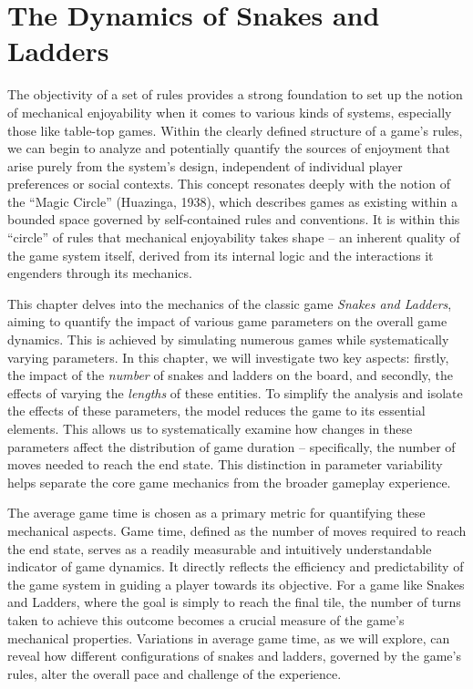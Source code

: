 \chapter{The Dynamics of Snakes and Ladders}

The objectivity of a set of rules provides a strong foundation to set up the notion of mechanical enjoyability when it comes to various kinds of systems, especially those like table-top games. Within the clearly defined structure of a game's rules, we can begin to analyze and potentially quantify the sources of enjoyment that arise purely from the system's design, independent of individual player preferences or social contexts.  This concept resonates deeply with the notion of the ``Magic Circle'' (Huazinga, 1938), which describes games as existing within a bounded space governed by self-contained rules and conventions. It is within this ``circle'' of rules that mechanical enjoyability takes shape – an inherent quality of the game system itself, derived from its internal logic and the interactions it engenders through its mechanics.

This chapter delves into the mechanics of the classic game \textit{Snakes and Ladders}, aiming to quantify the impact of various game parameters on the overall game dynamics. This is achieved by simulating numerous games while systematically varying parameters. In this chapter, we will investigate two key aspects: firstly, the impact of the \textit{number} of snakes and ladders on the board, and secondly, the effects of varying the \textit{lengths} of these entities. To simplify the analysis and isolate the effects of these parameters, the model reduces the game to its essential elements. This allows us to systematically examine how changes in these parameters affect the distribution of game duration – specifically, the number of moves needed to reach the end state. This distinction in parameter variability helps separate the core game mechanics from the broader gameplay experience.

The average game time is chosen as a primary metric for quantifying these mechanical aspects. Game time, defined as the number of moves required to reach the end state, serves as a readily measurable and intuitively understandable indicator of game dynamics. It directly reflects the efficiency and predictability of the game system in guiding a player towards its objective. For a game like Snakes and Ladders, where the goal is simply to reach the final tile, the number of turns taken to achieve this outcome becomes a crucial measure of the game's mechanical properties. Variations in average game time, as we will explore, can reveal how different configurations of snakes and ladders, governed by the game's rules, alter the overall pace and challenge of the experience.


